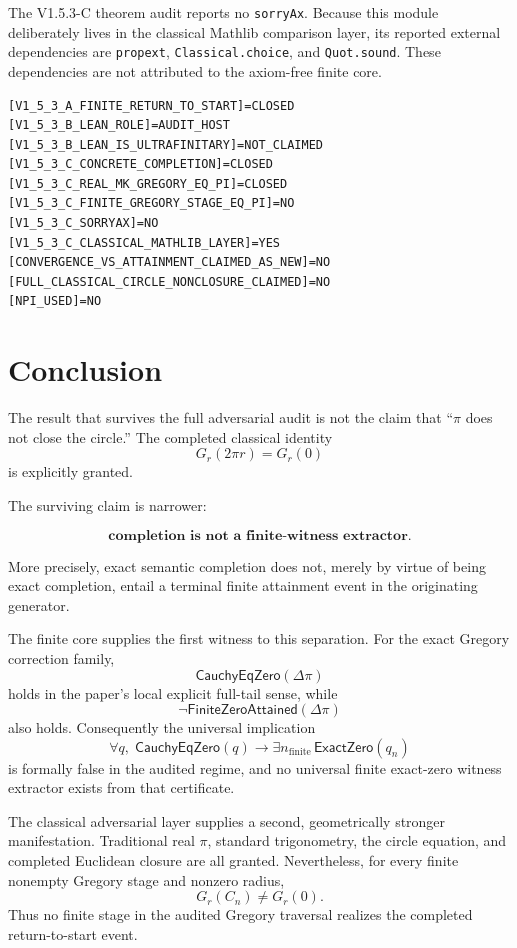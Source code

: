 \documentclass[11pt,a4paper]{article}
\begin{document}
The V1.5.3-C theorem audit reports no \texttt{sorryAx}.  Because this
module deliberately lives in the classical Mathlib comparison layer,
its reported external dependencies are
\texttt{propext}, \texttt{Classical.choice}, and \texttt{Quot.sound}.
These dependencies are not attributed to the axiom-free finite core.

\begin{verbatim}
[V1_5_3_A_FINITE_RETURN_TO_START]=CLOSED
[V1_5_3_B_LEAN_ROLE]=AUDIT_HOST
[V1_5_3_B_LEAN_IS_ULTRAFINITARY]=NOT_CLAIMED
[V1_5_3_C_CONCRETE_COMPLETION]=CLOSED
[V1_5_3_C_REAL_MK_GREGORY_EQ_PI]=CLOSED
[V1_5_3_C_FINITE_GREGORY_STAGE_EQ_PI]=NO
[V1_5_3_C_SORRYAX]=NO
[V1_5_3_C_CLASSICAL_MATHLIB_LAYER]=YES
[CONVERGENCE_VS_ATTAINMENT_CLAIMED_AS_NEW]=NO
[FULL_CLASSICAL_CIRCLE_NONCLOSURE_CLAIMED]=NO
[NPI_USED]=NO
\end{verbatim}

\section{Conclusion}

The result that survives the full adversarial audit is not the claim
that ``\(\pi\) does not close the circle.''  The completed classical
identity
\[
G_r(2\pi r)=G_r(0)
\]
is explicitly granted.

The surviving claim is narrower:

\[
\boxed{
\textbf{completion is not a finite-witness extractor.}
}
\]

More precisely, exact semantic completion does not, merely by virtue
of being exact completion, entail a terminal finite attainment event
in the originating generator.

The finite core supplies the first witness to this separation.  For
the exact Gregory correction family,
\[
\mathsf{CauchyEqZero}(\Delta\pi)
\]
holds in the paper's local explicit full-tail sense, while
\[
\neg\mathsf{FiniteZeroAttained}(\Delta\pi)
\]
also holds.  Consequently the universal implication
\[
\forall q,\;
\mathsf{CauchyEqZero}(q)
\rightarrow
\exists n_{\mathrm{finite}}\,
\mathsf{ExactZero}(q_n)
\]
is formally false in the audited regime, and no universal finite
exact-zero witness extractor exists from that certificate.

The classical adversarial layer supplies a second, geometrically
stronger manifestation.  Traditional real \(\pi\), standard
trigonometry, the circle equation, and completed Euclidean closure are
all granted.  Nevertheless, for every finite nonempty Gregory stage
and nonzero radius,
\[
G_r(C_n)\neq G_r(0).
\]
Thus no finite stage in the audited Gregory traversal realizes the
completed return-to-start event.
\end{document}

